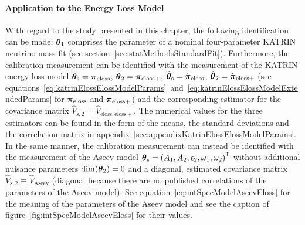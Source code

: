 \paragraph{Application to the Energy Loss Model}
With regard to the study presented in this chapter, the following identification can be made: $\boldsymbol{\mathbf{\theta}}_1$ comprises the parameter of a nominal four-parameter KATRIN neutrino mass fit (see section~\ref{sec:statMethodsStandardFit}). Furthermore, the calibration measurement can be identified with the measurement of the KATRIN energy loss model $\boldsymbol{\mathbf{\theta}}_\mathrm{s}=\boldsymbol{\mathbf{\pi}}_\mathrm{eloss}$, $\boldsymbol{\mathbf{\theta}}_2=\boldsymbol{\mathbf{\pi}}_\mathrm{eloss+}$, $\hat{\boldsymbol{\mathbf{\theta}}}_\mathrm{s}=\hat{\boldsymbol{\mathbf{\pi}}}_\mathrm{eloss}$, $\hat{\boldsymbol{\mathbf{\theta}}}_2=\hat{\boldsymbol{\mathbf{\pi}}}_\mathrm{eloss+}$ (see equations~\ref{eq:katrinElossElossModelParams}~and~\ref{eq:katrinElossElossModelExtendedParams} for $\boldsymbol{\mathbf{\pi}}_\mathrm{eloss}$ and $\boldsymbol{\mathbf{\pi}}_\mathrm{eloss+}$) and the corresponding estimator for the covariance matrix $\hat{V}_\mathrm{s,2}=\hat{V}_\mathrm{eloss,eloss+}$. The numerical values for the three estimators can be found in the form of the means, the standard deviations and the correlation matrix in appendix~\ref{sec:appendixKatrinElossElossModelParams}. In the same manner, the calibration measurement can instead be identified with the measurement of the Aseev model $\boldsymbol{\mathbf{\theta}}_\mathrm{s}={(A_1, A_2,\epsilon_2,\omega_1,\omega_2)}^{\mathsf{T}}$ without additional nuisance parameters $\mathrm{dim}(\boldsymbol{\mathbf{\theta}}_2)=0$ and a diagonal, estimated covariance matrix $\hat{V}_\mathrm{s,2}\equiv\hat{V}_\mathrm{Aseev}$ (diagonal because there are no published correlations of the parameters of the Aseev model). See equation~\eqref{eq:intSpecModelAseevEloss} for the meaning  of the parameters of the Aseev model and see the caption of figure~\ref{fig:intSpecModelAseevEloss} for their values.

